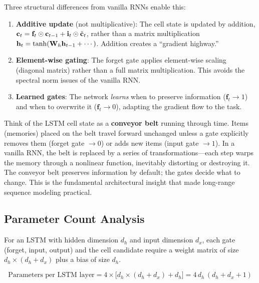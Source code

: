 Three structural differences from vanilla RNNs enable this:

\begin{enumerate}[leftmargin=*]
\item \textbf{Additive update} (not multiplicative): The cell state is
  updated by addition, $\mathbf{c}_t = \mathbf{f}_t \odot \mathbf{c}_{t-1} +
  \mathbf{i}_t \odot \tilde{\mathbf{c}}_t$, rather than a matrix multiplication
  $\mathbf{h}_t = \tanh(\mathbf{W}_h \mathbf{h}_{t-1} + \cdots)$.  Addition creates a
  ``gradient highway.''

\item \textbf{Element-wise gating}: The forget gate applies element-wise
  scaling (diagonal matrix) rather than a full matrix multiplication.  This
  avoids the spectral norm issues of the vanilla RNN.

\item \textbf{Learned gates}: The network \emph{learns} when to preserve
  information ($\mathbf{f}_t \to 1$) and when to overwrite it
  ($\mathbf{f}_t \to 0$), adapting the gradient flow to the task.
\end{enumerate}

\begin{keyinsight}
Think of the LSTM cell state as a \textbf{conveyor belt} running through
time.  Items (memories) placed on the belt travel forward unchanged unless
a gate explicitly removes them (forget gate $\to 0$) or adds new items
(input gate $\to 1$).  In a vanilla RNN, the belt is replaced by a series
of transformations---each step warps the memory through a nonlinear
function, inevitably distorting or destroying it.  The conveyor belt
preserves information by default; the gates decide what to change.
This is the fundamental architectural insight that made long-range
sequence modeling practical.
\end{keyinsight}

\subsection{Parameter Count Analysis}

For an LSTM with hidden dimension $d_h$ and input dimension $d_x$, each gate
(forget, input, output) and the cell candidate require a weight matrix of
size $d_h \times (d_h + d_x)$ plus a bias of size $d_h$.

\begin{equation}
\text{Parameters per LSTM layer}
= 4 \times \bigl[d_h \times (d_h + d_x) + d_h\bigr]
= 4\,d_h\,(d_h + d_x + 1)
\end{equation}

